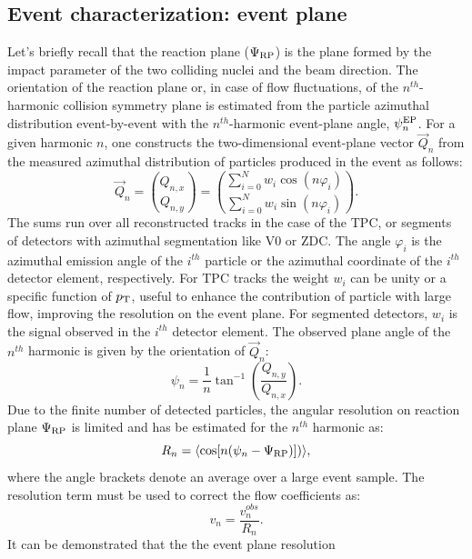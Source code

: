 \subsection{Event characterization: event plane}
\label{sec:EventPlane}
Let's briefly recall that the reaction plane ($\Psi_{\rm RP}$) is the 
plane formed by the impact parameter of the two colliding nuclei and the beam
direction. The orientation of the reaction plane or, in case of flow fluctuations, 
of the $n^{th}$-harmonic collision symmetry plane is estimated 
from the particle azimuthal distribution event-by-event
with the $n^{th}$-harmonic event-plane angle, $\psi_n^{\rm EP}$.
For a given harmonic $n$, one constructs the two-dimensional event-plane 
vector $\vec{Q}_n$ from the measured azimuthal distribution of 
particles produced in the event as follows:
\begin{equation}
\label{f:qvector}
 \vec{Q}_n= {Q_{n,x} \choose Q_{n,y}} = {\sum_{i=0}^{N} w_i \cos (n\varphi_i) \choose \sum_{i=0}^{N} w_i \sin (n\varphi_i)}.
\end{equation}
The sums run over all reconstructed tracks in the case 
of the TPC, or segments of detectors with azimuthal 
segmentation like V0 or ZDC. The angle $\varphi_i$ is 
the azimuthal emission angle of the $i^{th}$ particle or the 
azimuthal coordinate of the $i^{th}$ detector element, respectively. 
For TPC tracks the weight $w_i$ can be unity or a specific 
function of $p_{\rm T}$, useful to enhance the 
contribution of particle with large flow, improving 
the resolution on the event plane. For segmented detectors, $w_i$ is the 
signal observed in the $i^{th}$ detector element. The observed plane 
angle of the $n^{th}$ harmonic is given by the orientation of $\vec{Q}_n$:
\begin{equation}
\psi_n = \dfrac{1}{n} \tan^{-1} \left(\dfrac{Q_{n,y}}{Q_{n,x}}\right).
\end{equation}
Due to the finite number of detected particles, the
angular resolution on reaction plane $\Psi_{\rm RP}$ is limited and 
has be estimated for the $n^{th}$ harmonic as:
\begin{equation}
R_n = \langle {\rm cos}[n({\rm \psi}_n-{\rm \Psi}_{\rm RP})]) \rangle ,
\end{equation}
where the angle brackets denote an average over a large event sample.
The resolution term must be used to correct the flow coefficients as:
\begin{equation}
v_n = \frac{v_n^{obs}}{R_n}.
\end{equation}
It can be demonstrated that the the event plane resolution 
